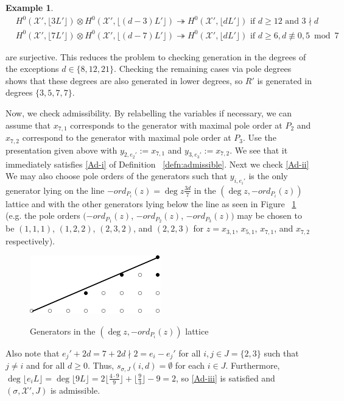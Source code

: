 \documentclass{amsart}
\theoremstyle{plain}
\theoremstyle{definition}
\newtheorem{example}[thm]{Example}
\theoremstyle{remark}
\numberwithin{equation}{section}
\newcommand\sx{\mathscr X}
\newcommand{\halfcan}{L}
\begin{document}
\begin{example}
\begin{align*}
	&H^0 (\sx', \lfloor 3 \halfcan' \rfloor) \otimes H^0 (\sx', \lfloor
	(d - 3) \halfcan' \rfloor) \twoheadrightarrow H^0 (\sx', \lfloor
	d \halfcan' \rfloor) \text{ if } d \geq 12 \text{ and } 3 \nmid d \\
	&H^0 (\sx', \lfloor 7 \halfcan' \rfloor) \otimes H^0 (\sx', \lfloor
	(d - 7) \halfcan' \rfloor) \twoheadrightarrow H^0 (\sx', \lfloor
	d \halfcan' \rfloor) \text{ if } d \geq 6, d \not\equiv 0, 5
	\bmod 7
\end{align*}

\noindent
are surjective. This reduces the problem to checking generation
in the degrees of the exceptions $d \in \{8, 12, 21\}$.
Checking the remaining cases via pole degrees shows that
these degrees are also generated in lower degrees,
so $R'$ is generated in degrees $\{3, 5, 7, 7\}$.

Now, we check admissibility. By relabelling the
variables if necessary, we can assume that $x_{7, 1}$ corresponds
to the generator with maximal pole order at $P_2$ and $x_{7, 2}$
correspond to the generator with maximal pole order at $P_3$. Use
the presentation given above with $y _{2, e_2'} := x_{7, 1}$ and
$y_{3, e_3'} :=  x_{7, 2}$. We see that it immediately satisfies
\ref{Ad-i} of Definition ~\ref{defn:admissible}. Next we check \ref{Ad-ii} We may also choose
pole orders of the generators such that $y_{i, e_i'}$ is the only
generator lying on the line $-ord_{P_i}(z) = \deg z \frac{3d}{7}$
in the $(\deg z, -ord_{P_i}(z))$  lattice and with the other
generators lying below the line as seen in Figure ~\ref{fig:377}
(e.g. the pole orders $(-ord_{P_1}(z)$, $-ord_{P_2}(z)$, $-ord_{P_3}
(z))$ may be chosen to be $(1, 1, 1)$, $(1, 2, 2)$, $(2, 3, 2)$,
and $(2, 2, 3)$ for $z = x_{3, 1}$, $x_{5, 1}$, $x_{7, 1}$, and
$x_{7, 2}$ respectively).

\begin{figure}[H]
\includegraphics{pics/spin-377-pic-pics.pdf} \\
\caption{Generators in the $(\deg z, -ord_{P_i}(z))$ lattice}
\label{fig:377}
\end{figure}

Also note that $e_j' + 2d = 7 + 2d \nmid 2 = e_i - e_j'$ for all
$i, j \in J = \{2, 3\}$ such that $j \neq i$ and for all $d \geq
0$. Thus, $s_{\sigma, J}(i, d) = \emptyset$ for each $i \in J$.
Furthermore, $\deg \lfloor e_i \halfcan \rfloor = \deg \lfloor 9
\halfcan \rfloor = 2 \lfloor \frac{4 \cdot 9}{9} \rfloor + \lfloor
\frac{9}{3} \rfloor - 9 = 2$, so \ref{Ad-iii} is satisfied and
$(\sigma, \sx', J)$ is admissible.


\end{example}
\end{document}
